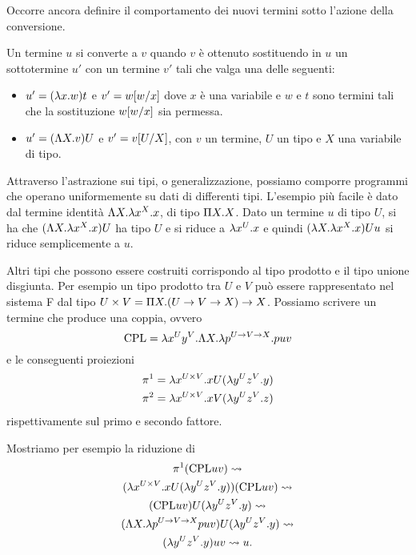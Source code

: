 \documentclass[]{marticle}
\begin{document}
Occorre ancora definire il comportamento dei nuovi termini sotto l'azione della
conversione.
\begin{block}[Definizione]
    Un termine $u$ si converte a $v$ quando $v$ \`e ottenuto sostituendo in $u$
    un sottotermine $u'$ con un termine $v'$ tali che valga una delle seguenti:
    \begin{itemize}
        \item $u'= (\l x. w)t$ e $v' = w\sub{w}{x}$ dove $x$ \`e una variabile e
            $w$ e $t$ sono termini tali che la sostituzione $w\sub{w}{x}$ sia
            permessa.
        \item $u' = (\L X.v)U$ e $v'=v\sub{U}{X}$, con $v$ un termine, $U$ un
            tipo e $X$ una variabile di tipo.
    \end{itemize}
\end{block}

Attraverso l'astrazione sui tipi, o generalizzazione, possiamo comporre
programmi che operano uniformemente su dati di differenti tipi. L'esempio pi\`u
facile \`e dato dal termine identit\`a $\L X. \l x^X. x$, di tipo $\P X. X$.
Dato un termine $u$ di tipo $U$, si ha che $(\L X. \l x^X. x)U$ ha tipo $U$ e si
riduce a $\l x^U.x$ e quindi $(\l X. \l x^X. x)Uu$ si riduce semplicemente a
$u$.

Altri tipi che possono essere costruiti corrispondo al tipo prodotto e il tipo
unione disgiunta. Per esempio un tipo prodotto tra $U$ e $V$ pu\`o essere
rappresentato nel sistema F dal tipo $U\times V = \P X. (U\rar V \rar X) \rar
X$. Possiamo scrivere un termine che produce una coppia, ovvero
\[
    \text{CPL} = \l x^U  y^V. \L X. \l p^{U \rar V\rar X}. puv
\]
e le conseguenti proiezioni
\begin{gather*}
    \pi^1 = \l x^{U\times V}. xU(\l y^U z^V.y) \\
    \pi^2 = \l x^{U\times V}. xV(\l y^U z^V.z)
\end{gather*}
rispettivamente sul primo e secondo fattore.

Mostriamo per esempio la riduzione di 
\begin{gather*}
    \pi^1 (\text{CPL}uv) \conv \\
    (\l x^{U\times V}. xU(\l y^U z^V.y))(\text{CPL}uv) \conv \\
    (\text{CPL}uv)U (\l y^U z^V.y) \conv \\
    (\L X. \l p^{U\rar V \rar X} puv)U (\l y^U z^V.y)  \conv \\
    (\l y^U z^V.y)uv \conv u.
\end{gather*}
\end{document}
